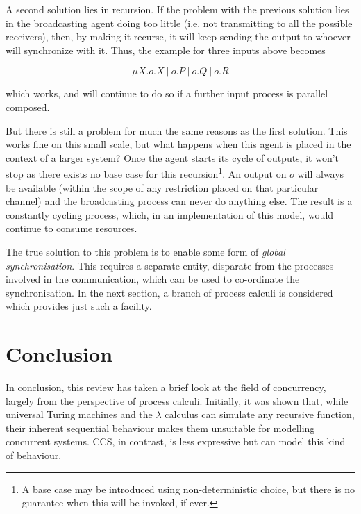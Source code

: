 A second solution lies in recursion.  If the problem with the previous
solution lies in the broadcasting agent doing too little (i.e. not
transmitting to all the possible receivers), then, by making it
recurse, it will keep sending the output to whoever will synchronize
with it.  Thus, the example for three inputs above becomes

\begin{equation}
\mu X.\overline{o}.X\ |\ o.P\ |\ o.Q\ |\ o.R
\end{equation}

\noindent which works, and will continue to do so if a further
input process is parallel composed.  

But there is still a problem for much the same reasons as the first
solution.  This works fine on this small scale, but what happens when
this agent is placed in the context of a larger system?  Once the agent
starts its cycle of outputs, it won't stop as there exists
no base case for this recursion\footnote{A base case may be introduced
using non-deterministic choice, but there is no guarantee when this will
be invoked, if ever.}.  An output on $o$ will always be available (within
the scope of any restriction placed on that particular channel) and
the broadcasting process can never do anything else.  The result is a
constantly cycling process, which, in an implementation of this model,
would continue to consume resources.

The true solution to this problem is to enable some form of
\emph{global synchronisation}.  This requires a separate entity,
disparate from the processes involved in the communication, which can
be used to co-ordinate the synchronisation.  In the next section, a
branch of process calculi is considered which provides just such a facility.

\section{Conclusion}

In conclusion, this review has taken a brief look at the field of
concurrency, largely from the perspective of process calculi.
Initially, it was shown that, while universal Turing machines and the
$\lambda$ calculus can simulate any recursive function, their inherent
sequential behaviour makes them unsuitable for modelling concurrent
systems.  CCS, in contrast, is less expressive but can model this kind
of behaviour.





